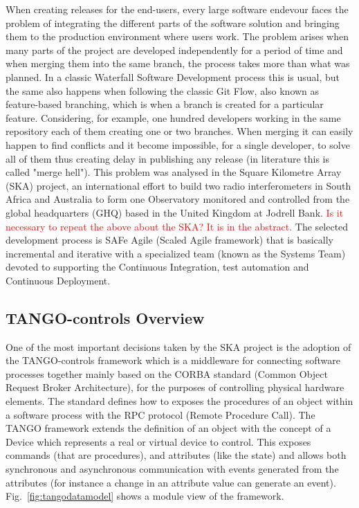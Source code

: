 \documentclass[a4paper]{spie}  %
\begin{document}
When creating releases for the end-users, every large software endevour faces the problem of integrating the different parts of the software solution and bringing them to the production environment where users work. The problem arises when many parts of the project are developed independently for a period of time and when merging them into the same branch, the process takes more than what was planned. In a classic Waterfall Software Development process this is usual, but the same also happens when following the classic Git Flow, also known as feature-based branching, which is when a branch is created for a particular feature. Considering, for example, one hundred developers working in the same repository each of them creating one or two branches. When merging it can easily happen to find conflicts and it become impossible, for a single developer, to solve all of them thus creating delay in publishing any release (in literature this is called "merge hell").
This problem was analysed in the Square Kilometre Array (SKA) project, an international effort to build two radio interferometers in South Africa and Australia to form one Observatory monitored and controlled from the global headquarters (GHQ) based in the United Kingdom at Jodrell Bank.
\textcolor{red}{Is it necessary to repeat the above about the SKA?  It is in the abstract.}
The selected development process is SAFe Agile (Scaled Agile framework) that is basically incremental and iterative with a specialized team (known as the Systems Team) devoted to supporting the Continuous Integration, test automation and Continuous Deployment.

\subsection{TANGO-controls Overview}
One of the most important decisions taken by the SKA project is the adoption of the TANGO-controls\cite{tango-controls} framework which is a middleware for connecting software processes together mainly based on the CORBA standard (Common Object Request Broker Architecture), for the purposes of controlling physical hardware elements. The standard defines how to exposes the procedures of an object within a software process with the RPC protocol (Remote Procedure Call).  The TANGO framework extends the definition of an object with the concept of a Device which represents a real or virtual device to control.  This exposes commands (that are procedures), and attributes (like the state) and allows both synchronous and asynchronous communication with events generated from the attributes (for instance a change in an attribute value can generate an event). Fig.~\ref{fig:tangodatamodel}  shows a module view of the framework.
\end{document}
